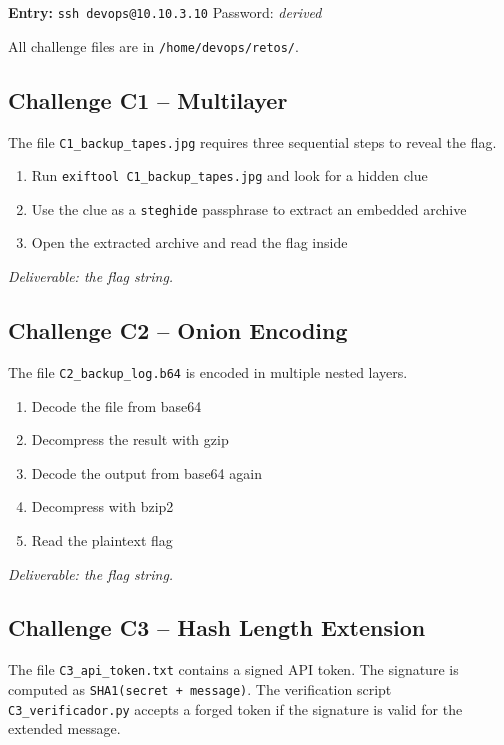 \documentclass[a4paper, 12pt]{article}
\begin{document}
\textbf{Entry:} \texttt{ssh devops@10.10.3.10} \quad Password: \textit{derived}

All challenge files are in \texttt{/home/devops/retos/}.

\subsection{Challenge C1 -- Multilayer}

The file \texttt{C1\_backup\_tapes.jpg} requires three sequential steps to reveal the flag.

\begin{enumerate}[leftmargin=2em]
  \item Run \texttt{exiftool C1\_backup\_tapes.jpg} and look for a hidden clue
  \item Use the clue as a \texttt{steghide} passphrase to extract an embedded archive
  \item Open the extracted archive and read the flag inside
\end{enumerate}

\textit{Deliverable: the flag string.}

\subsection{Challenge C2 -- Onion Encoding}

The file \texttt{C2\_backup\_log.b64} is encoded in multiple nested layers.

\begin{enumerate}[leftmargin=2em]
  \item Decode the file from base64
  \item Decompress the result with gzip
  \item Decode the output from base64 again
  \item Decompress with bzip2
  \item Read the plaintext flag
\end{enumerate}

\textit{Deliverable: the flag string.}

\subsection{Challenge C3 -- Hash Length Extension}

The file \texttt{C3\_api\_token.txt} contains a signed API token.
The signature is computed as \texttt{SHA1(secret + message)}.
The verification script \texttt{C3\_verificador.py} accepts a forged token
if the signature is valid for the extended message.
\end{document}
